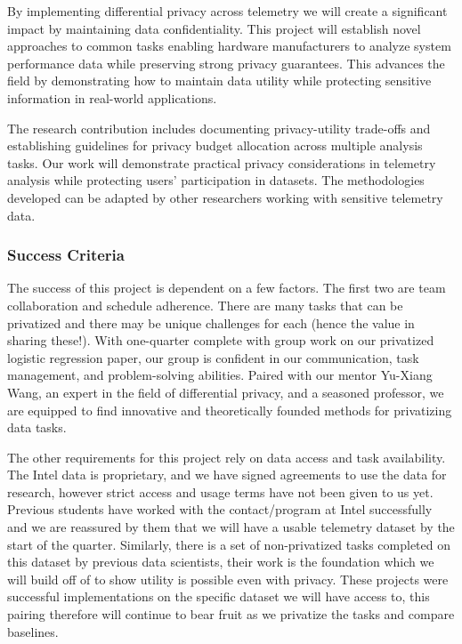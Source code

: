 \documentclass[12pt,letterpaper]{article}
\begin{document}
By implementing differential privacy across telemetry we will create a significant impact by maintaining data confidentiality. This project will establish novel approaches to common tasks enabling hardware manufacturers to analyze system performance data while preserving strong privacy guarantees. This advances the field by demonstrating how to maintain data utility while protecting sensitive information in real-world applications. 

The research contribution includes documenting privacy-utility trade-offs and establishing guidelines for privacy budget allocation across multiple analysis tasks. Our work will demonstrate practical privacy considerations in telemetry analysis while protecting users’ participation in datasets. The methodologies developed can be adapted by other researchers working with sensitive telemetry data. 

\subsubsection{Success Criteria}

The success of this project is dependent on a few factors. The first two are team collaboration and schedule adherence. There are many tasks that can be privatized and there may be unique challenges for each (hence the value in sharing these!). With one-quarter complete with group work on our privatized logistic regression paper, our group is confident in our communication, task management, and problem-solving abilities. Paired with our mentor Yu-Xiang Wang, an expert in the field of differential privacy, and a seasoned professor, we are equipped to find innovative and theoretically founded methods for privatizing data tasks.

The other requirements for this project rely on data access and task availability. The Intel data is proprietary, and we have signed agreements to use the data for research, however strict access and usage terms have not been given to us yet. Previous students have worked with the contact/program at Intel successfully and we are reassured by them that we will have a usable telemetry dataset by the start of the quarter.  Similarly, there is a set of non-privatized tasks completed on this dataset by previous data scientists, their work is the foundation which we will build off of to show utility is possible even with privacy. These projects were successful implementations on the specific dataset we will have access to, this pairing therefore will continue to bear fruit as we privatize the tasks and compare baselines. 
\end{document}
